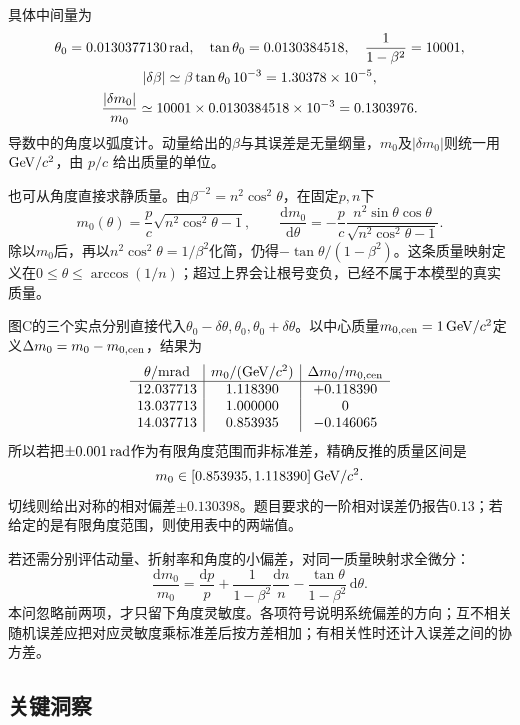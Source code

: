 \documentclass[UTF8,fontset=fandol,a4paper,11pt]{ctexart}
\begin{document}
具体中间量为
\[
\begin{gathered}
\theta_0=0.0130377130\,{\rm rad},\quad
\tan\theta_0=0.0130384518,\quad
\frac1{1-\beta^2}=10001,\\
|\delta\beta|\simeq\beta\tan\theta_0\,10^{-3}
=1.30378\times10^{-5},\\
\frac{|\delta m_0|}{m_0}\simeq
10001\times0.0130384518\times10^{-3}=0.1303976 .
\end{gathered}
\]
导数中的角度以弧度计。动量给出的$\beta$与其误差是无量纲量，$m_0$及$|\delta m_0|$则统一用$ {\rm GeV}/c^2$，由 $p/c$ 给出质量的单位。

也可从角度直接求静质量。由$\beta^{-2}=n^2\cos^2\theta$，在固定$p,n$下
\[
m_0(\theta)=\frac pc\sqrt{n^2\cos^2\theta-1},\qquad
\frac{\mathrm dm_0}{\mathrm d\theta}
=-\frac pc\frac{n^2\sin\theta\cos\theta}
 {\sqrt{n^2\cos^2\theta-1}}.
\]
除以$m_0$后，再以$n^2\cos^2\theta=1/\beta^2$化简，仍得$-\tan\theta/(1-\beta^2)$。这条质量映射定义在$0\le\theta\le\arccos(1/n)$；超过上界会让根号变负，已经不属于本模型的真实质量。

图C的三个实点分别直接代入$\theta_0-\delta\theta,\theta_0,\theta_0+\delta\theta$。以中心质量$m_{0,\rm cen}=1\,{\rm GeV}/c^2$定义$\Delta m_0=m_0-m_{0,\rm cen}$，结果为
\[
\begin{array}{c|c|c}
\theta/ {\rm mrad}&m_0/({\rm GeV}/c^2)&\Delta m_0/m_{0,\rm cen}\\ \hline
12.037713&1.118390&+0.118390\\
13.037713&1.000000&0\\
14.037713&0.853935&-0.146065
\end{array}
\]
所以若把$\pm0.001\,{\rm rad}$作为有限角度范围而非标准差，精确反推的质量区间是
\[
m_0\in[0.853935,1.118390]\,{\rm GeV}/c^2 .
\]
切线则给出对称的相对偏差$\pm0.130398$。题目要求的一阶相对误差仍报告$0.13$；若给定的是有限角度范围，则使用表中的两端值。

若还需分别评估动量、折射率和角度的小偏差，对同一质量映射求全微分：
\[
\frac{\mathrm dm_0}{m_0}
=\frac{\mathrm dp}{p}
+\frac1{1-\beta^2}\frac{\mathrm dn}{n}
-\frac{\tan\theta}{1-\beta^2}\,\mathrm d\theta .
\]
本问忽略前两项，才只留下角度灵敏度。各项符号说明系统偏差的方向；互不相关随机误差应把对应灵敏度乘标准差后按方差相加；有相关性时还计入误差之间的协方差。






\subsection*{关键洞察}
\end{document}
